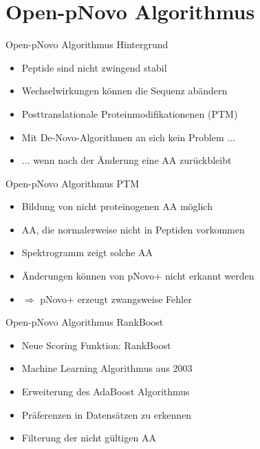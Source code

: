 \documentclass{beamer}
\newcommand{\dashAndSpace}{\textendash \space}
\begin{document}
    \section{Open-pNovo Algorithmus}
    \begin{frame}{Open-pNovo Algorithmus \dashAndSpace Hintergrund}
     \begin{itemize}
      \item<1-> Peptide sind nicht zwingend stabil
      \item<1-> Wechselwirkungen können die Sequenz abändern
      \item<1-> Posttranslationale Proteinmodifikationenen (PTM)
      \item<2-> Mit De-Novo-Algorithmen an sich kein Problem ...
      \item<3-> ... wenn nach der Änderung eine AA zurückbleibt
     \end{itemize}
    \end{frame}

    \begin{frame}{Open-pNovo Algorithmus \dashAndSpace PTM}
     \begin{itemize}
      \item<1-> Bildung von nicht proteinogenen AA möglich
      \item<1-> AA, die normalerweise nicht in Peptiden vorkommen
      \item<2-> Spektrogramm zeigt solche AA
      \item<2-> Änderungen können von pNovo+ nicht erkannt werden
      \end{itemize}
      \begin{itemize}
      \item<3-> $\Rightarrow$ pNovo+ erzeugt zwangsweise Fehler
     \end{itemize}
    \end{frame}

      \begin{frame}{Open-pNovo Algorithmus \dashAndSpace RankBoost}
     \begin{itemize}
      \item<1-> Neue Scoring Funktion: RankBoost
      \item<1-> Machine Learning Algorithmus aus 2003
      \item<1-> Erweiterung des AdaBoost Algorithmus
      \item<1-> Präferenzen in Datensätzen zu erkennen
      \end{itemize}
      \begin{itemize}
      \item<2-> Filterung der nicht gültigen AA
     \end{itemize}
    \end{frame}
\end{document}
